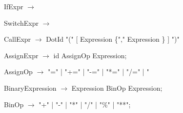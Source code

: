 \documentclass{article}
\newcommand{\is}[0]{{$\rightarrow$ }}
\begin{document}
\begin{list}{}{}
\item IfExpr \is
\item SwitchExpr \is

\item CallExpr \is DotId "(" [ Expression \{"," Expression \} ] ")"

\item AssignExpr \is id AssignOp Expression;
\item AssignOp \is "=" | "+=" | "-=" | "*=" | "/=" | "%

\item BinaryExpression \is Expression BinOp Expression;
\item BinOp \is "+" | "-" | "*" | "/" | "\%" | "**";


\end{list}
\end{document}
